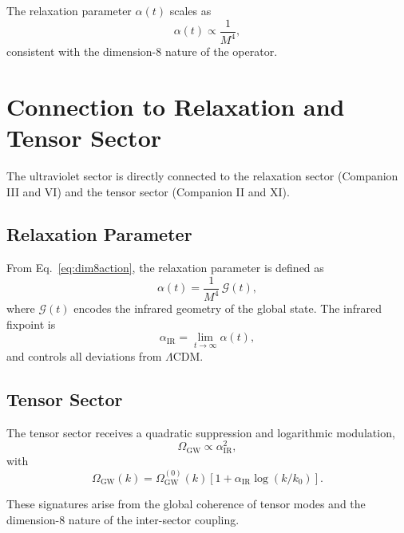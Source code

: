 \documentclass[11pt,a4paper]{article}
\begin{document}
The relaxation parameter $\alpha(t)$ scales as
\begin{equation}
\alpha(t) \propto \frac{1}{M^4},
\end{equation}
consistent with the dimension-8 nature of the operator.

\section[Connection to Relaxation and Tensor Sector]{Connection to Relaxation and Tensor Sector}

The ultraviolet sector is directly connected to the relaxation sector
(Companion III and VI) and the tensor sector (Companion II and XI).

\subsection[Relaxation Parameter]{Relaxation Parameter}

From Eq.~\eqref{eq:dim8action}, the relaxation parameter is defined as
\begin{equation}
\alpha(t) = \frac{1}{M^4} \, \mathcal{G}(t),
\end{equation}
where $\mathcal{G}(t)$ encodes the infrared geometry of the global state. The
infrared fixpoint is
\begin{equation}
\alpha_{\mathrm{IR}} = \lim_{t \to \infty} \alpha(t),
\end{equation}
and controls all deviations from $\Lambda$CDM.

\subsection[Tensor Sector]{Tensor Sector}

The tensor sector receives a quadratic suppression and logarithmic modulation,
\begin{equation}
\Omega_{\mathrm{GW}} \propto \alpha_{\mathrm{IR}}^2,
\end{equation}
with
\begin{equation}
\Omega_{\mathrm{GW}}(k)
=
\Omega_{\mathrm{GW}}^{(0)}(k)
\left[ 1 + \alpha_{\mathrm{IR}} \log(k/k_0) \right].
\end{equation}

These signatures arise from the global coherence of tensor modes and the
dimension-8 nature of the inter-sector coupling.
\end{document}
